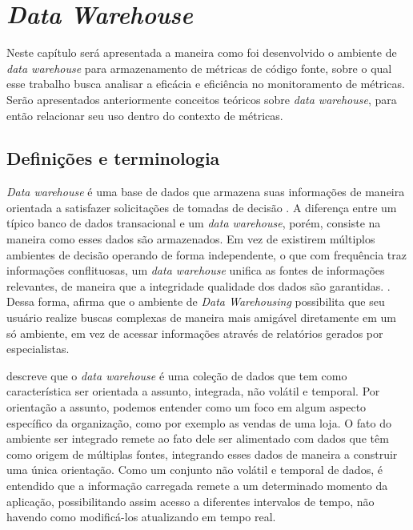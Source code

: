 \chapter{\textit{Data Warehouse}} 
\label{chap:arquitetura}

Neste capítulo será apresentada a maneira como foi desenvolvido o ambiente de \textit{data warehouse} para armazenamento de métricas de código fonte, sobre o qual esse trabalho busca analisar a eficácia e eficiência no monitoramento de métricas. Serão apresentados anteriormente conceitos teóricos sobre \textit{data warehouse}, para então relacionar seu uso dentro do contexto de métricas. 

\section{Definições e terminologia}

\textit{Data warehouse} é uma base de dados que armazena suas informações de maneira orientada a satisfazer solicitações de tomadas de decisão \cite{chaudhuri1997}. A diferença entre um típico banco de dados transacional e um  \textit{data warehouse}, porém, consiste na maneira como esses dados são armazenados. Em vez de existirem múltiplos ambientes de decisão operando de forma independente, o que com frequência traz informações conflituosas, um \textit{data warehouse} unifica as fontes de informações relevantes, de maneira que a integridade  qualidade dos dados são garantidas. \cite{neeraj_sharma_2011}. Dessa forma,  afirma que o ambiente de \textit{Data Warehousing} possibilita que seu usuário realize buscas complexas de maneira mais amigável diretamente em um só ambiente, em vez de acessar informações através de relatórios gerados por especialistas. 

 descreve que o \textit{data warehouse} é uma coleção de dados que tem como característica ser orientada a assunto, integrada, não volátil e temporal. Por orientação a assunto, podemos entender como um foco em algum aspecto específico da organização, como por exemplo as vendas de uma loja. O fato do ambiente ser integrado remete ao fato dele ser alimentado com dados que têm como origem de múltiplas fontes, integrando esses dados de maneira a construir uma única orientação. Como um conjunto não volátil e temporal de dados, é entendido que a informação carregada remete a um determinado momento da aplicação, possibilitando assim acesso a diferentes intervalos de tempo, não havendo como modificá-los atualizando em tempo real. 

